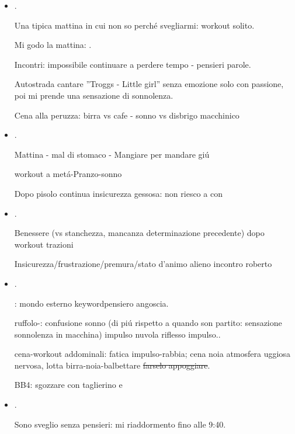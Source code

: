 \begin{itemize}
\item {}.

Una tipica mattina in cui non so perch\'e svegliarmi: workout solito.

Mi godo la mattina: .

Incontri: impossibile continuare a perdere tempo - pensieri parole.

Autostrada cantare ''Troggs - Little girl'' senza emozione solo con passione, poi mi prende una sensazione di sonnolenza.

Cena alla peruzza: birra vs cafe - sonno vs disbrigo macchinico

\item {}.

Mattina - mal di stomaco - Mangiare per mandare gi\'u

workout a met\'a-Pranzo-sonno

Dopo pisolo continua insicurezza gessosa: non riesco a  con 


\item {}.

Benessere (vs stanchezza, mancanza determinazione precedente) dopo workout trazioni

Insicurezza/frustrazione/premura/stato d'animo alieno incontro roberto

\item {}.

: mondo esterno keyword{pensiero angoscia}.

ruffolo-: confusione sonno (di pi\'u rispetto a quando son partito: sensazione sonnolenza in macchina) impulso nuvola riflesso impulso..

cena-workout addominali: fatica  impulso-rabbia; cena noia atmosfera uggiosa nervosa, lotta birra-noia-balbettare \sout{farselo appoggiare}.

BB4: sgozzare con taglierino e 

\item {}.

Sono sveglio senza pensieri: mi riaddormento fino alle 9:40.


\end{itemize}
